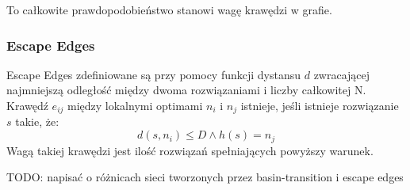To całkowite prawdopodobieństwo stanowi wagę krawędzi w grafie.

\subsubsection*{Escape Edges}
Escape Edges zdefiniowane są przy pomocy funkcji dystansu $d$ zwracającej najmniejszą odległość między dwoma rozwiązaniami
i liczby całkowitej N.
Krawędź $e_{ij}$ między lokalnymi optimami $n_i$ i $n_j$ istnieje, jeśli istnieje rozwiązanie $s$ takie, że:
$$d(s, n_i) \leq D \land h(s)=n_j$$
Wagą takiej krawędzi jest ilość rozwiązań spełniających powyższy warunek.

TODO: napisać o różnicach sieci tworzonych przez basin-transition i escape edges